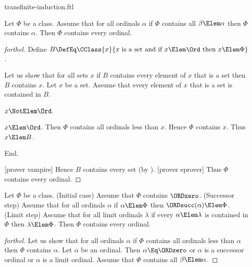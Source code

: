 \documentclass{stex}
\begin{document}
\begin{smodule}{transfinite-induction.ftl}


\begin{theorem}[forthel,title=Transfinite Induction I,name=transfinite induction I]
  Let $\Phi$ be a class.
  Assume that for all ordinals $\alpha$ if $\Phi$ contains all $\beta \Elem \alpha$ then $\Phi$ contains $\alpha$.
  Then $\Phi$ contains every ordinal.
\end{theorem}
\begin{proof}[forthel]
  Define $B \DefEq \CClass{x}{x\text{ is a set and if }x \Elem \Ord\text{ then }x \Elem \Phi}$.

  Let us show that for all sets $x$ if $B$ contains every element of $x$ that is a set then $B$ contains $x$.
    Let $x$ be a set.
    Assume that every element of $x$ that is a set is contained in $B$.

    \begin{case}{$x \NotElem \Ord$.} \end{case}

    \begin{case}{$x \Elem \Ord$.}
      Then $\Phi$ contains all ordinals less than $x$.
      Hence $\Phi$ contains $x$.
      Thus $x \Elem B$.
    \end{case}
  End.

  [prover vampire]
  Hence $B$ contains every set (by ).
  [prover eprover]
  Thus $\Phi$ contains every ordinal.
\end{proof}

\begin{theorem}[forthel,title=Transfinite Induction II,name=transfinite induction II]
  Let $\Phi$ be a class.
  (Initial case) Assume that $\Phi$ contains $\ORDzero$.
  (Successor step) Assume that for all ordinals $\alpha$ if $\alpha \Elem \Phi$ then $\ORDsucc(\alpha) \Elem \Phi$.
  (Limit step) Assume that for all limit ordinals $\lambda$ if every $\alpha \Elem \lambda$ is contained in $\Phi$ then $\lambda \Elem \Phi$.
  Then $\Phi$ contains every ordinal.
\end{theorem}
\begin{proof}[forthel]
  Let us show that for all ordinals $\alpha$ if $\Phi$ contains all ordinals
  less than $\alpha$ then $\Phi$ contains $\alpha$.
    Let $\alpha$ be an ordinal.
    Then $\alpha \Eq \ORDzero$ or $\alpha$ is a successor ordinal or $\alpha$ is a
    limit ordinal.
    Assume that $\Phi$ contains all $\beta \Elem \alpha$.


\end{proof}
\end{smodule}
\end{document}
